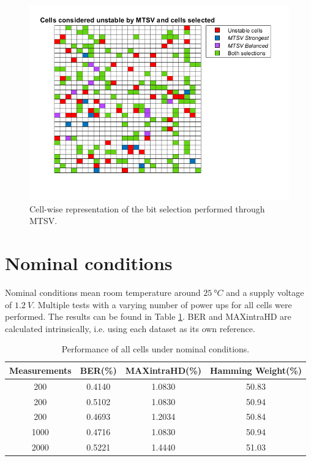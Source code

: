 \begin{figure}[H]
    \centering
    \includegraphics[width=14cm]{images/MTSVselection.png}
    \caption{Cell-wise representation of the bit selection performed through MTSV.}
    \label{fig:MTSVselection}
\end{figure}







\section{Nominal conditions}

Nominal conditions mean room temperature around $\SI{25}{\degree C}$ and a supply voltage of $\SI{1.2}{V}$. Multiple tests with a varying number of power ups for all cells were performed. The results can be found in Table \ref{tab:Nom}. BER and MAXintraHD are calculated intrinsically, i.e. using each dataset as its own reference. 


\begin{table}[H]
  \centering
  \caption{Performance of all cells under nominal conditions.}
    \begin{tabular}{|c|c|c|c|}
    \hline
    Measurements & BER(\%)   & MAXintraHD(\%) & Hamming Weight(\%) \bigstrut\\
    \hline
    200   & 0.4140 & 1.0830 & 50.83 \bigstrut\\
    \hline
    200   & 0.5102 & 1.0830 & 50.94 \bigstrut\\
    \hline
    200   & 0.4693 & 1.2034 & 50.84 \bigstrut\\
    \hline
    1000  & 0.4716 & 1.0830 & 50.94 \bigstrut\\
    \hline
    2000  & 0.5221 & 1.4440 & 51.03 \bigstrut\\
    \hline
    \end{tabular}%
  \label{tab:Nom}%
\end{table}%

